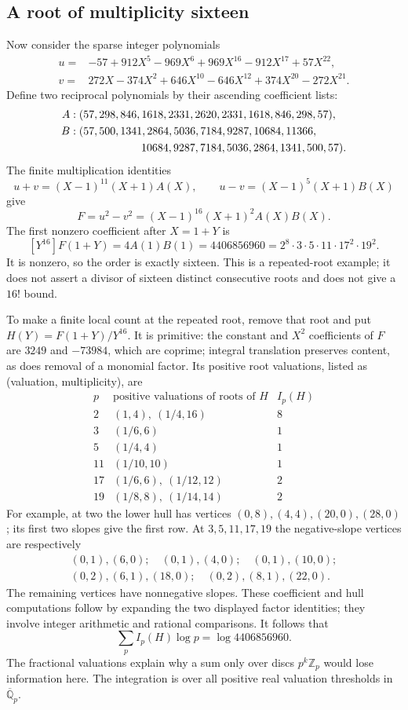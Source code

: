 \subsection{A root of multiplicity sixteen}
Now consider the sparse integer polynomials
\begin{align*}
 u={}&-57+912X^5-969X^6+969X^{16}-912X^{17}+57X^{22},\\
 v={}&272X-374X^2+646X^{10}-646X^{12}+374X^{20}-272X^{21}.
\end{align*}
Define two reciprocal polynomials by their ascending coefficient lists:
\begin{align*}
 A:\;&(57,298,846,1618,2331,2620,2331,1618,846,298,57),\\
 B:\;&(57,500,1341,2864,5036,7184,9287,10684,11366,\\
     &\hspace{20mm}10684,9287,7184,5036,2864,1341,500,57).
\end{align*}
The finite multiplication identities
\[
 u+v=(X-1)^{11}(X+1)A(X),\qquad
 u-v=(X-1)^5(X+1)B(X)
\]
give
\[
 F=u^2-v^2=(X-1)^{16}(X+1)^2A(X)B(X).
\]
The first nonzero coefficient after $X=1+Y$ is
\[
 [Y^{16}]F(1+Y)=4A(1)B(1)=4406856960
 =2^8\cdot3\cdot5\cdot11\cdot17^2\cdot19^2.
\]
It is nonzero, so the order is exactly sixteen.
This is a repeated-root example; it does not assert a divisor of
sixteen distinct consecutive roots and does not give a $16!$ bound.

To make a finite local count at the repeated root, remove that root
and put $H(Y)=F(1+Y)/Y^{16}$. It is primitive: the constant and $X^2$ coefficients of $F$ are $3249$ and $-73984$, which are coprime; integral translation preserves content, as does removal of a monomial factor.
Its positive root valuations, listed as (valuation, multiplicity), are
\[
\begin{array}{c|l|r}
 p&\text{positive valuations of roots of }H&I_p(H)\\\hline
 2&(1,4),\ (1/4,16)&8\\
 3&(1/6,6)&1\\
 5&(1/4,4)&1\\
 11&(1/10,10)&1\\
 17&(1/6,6),\ (1/12,12)&2\\
 19&(1/8,8),\ (1/14,14)&2
\end{array}
\]
For example, at two the lower hull has vertices
$(0,8),(4,4),(20,0),(28,0)$; its first two slopes give the first row.
At $3,5,11,17,19$ the negative-slope vertices are respectively
\[
\begin{gathered}
 (0,1),(6,0);\quad(0,1),(4,0);\quad(0,1),(10,0);\\
 (0,2),(6,1),(18,0);\quad(0,2),(8,1),(22,0).
\end{gathered}
\]
The remaining vertices have nonnegative slopes. These coefficient
and hull computations follow by expanding the two displayed factor
identities; they involve integer arithmetic and rational comparisons.
It follows that
\[
 \sum_p I_p(H)\log p=\log4406856960.
\]
The fractional valuations explain why a sum only over discs
$p^k\mathbb Z_p$ would lose information here. The integration is over
all positive real valuation thresholds in $\overline{\mathbb Q}_p$.

